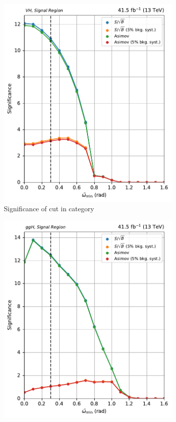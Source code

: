 \begin{figure}[htbp]
\begin{subfigure}[b]{0.27\textwidth}
        \includegraphics[width=\textwidth]{figures/category_optimisations/with_mindphi_cut/significance_VH_min_omega_tilde_all.pdf}
        \caption{Significance of cut in \VH category}
    \end{subfigure}
    \hfill
    \begin{subfigure}[b]{0.27\textwidth}
        \includegraphics[width=\textwidth]{figures/category_optimisations/with_mindphi_cut/significance_ggH_min_omega_tilde_all.pdf}

\end{subfigure}
\end{figure}
